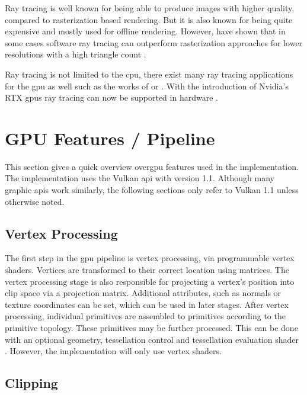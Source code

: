 Ray tracing is well known for being able to produce images with higher quality, compared to rasterization based rendering. But it is also known for being quite expensive and mostly used for offline rendering. However, \textcite{wald:2001:interactive} have shown that in some cases software ray tracing can  outperform rasterization approaches for lower resolutions with a high triangle count \cite{wald:2001:interactive}.

Ray tracing is not limited to the \gls{cpu}, there exist many ray tracing applications for the \gls{gpu} as well such as the works of \textcite{foley:2005:kd} or \textcite{parker:2010:optix}. With the introduction of Nvidia's RTX \glspl{gpu} ray tracing can now be supported in hardware \cite{raytracinggems}.


\section{GPU Features / Pipeline}

This section gives a quick overview over\gls{gpu} features used in the implementation. The implementation uses the Vulkan \gls{api} with version 1.1. Although many graphic \glspl{api} work similarly, the following sections only refer to Vulkan 1.1 unless otherwise noted.


\subsection{Vertex Processing}

The first step in the \gls{gpu} pipeline is vertex processing, via programmable vertex shaders. Vertices are transformed to their correct location using matrices. The vertex processing stage is also responsible for projecting a vertex's position into clip space via a projection matrix. Additional attributes, such as normals or texture coordinates can be set, which can be used in later stages. After vertex processing, individual primitives are assembled to primitives according to the primitive topology. These primitives may be further processed. This can be done with an optional geometry, tessellation control and tessellation evaluation shader \cite{akine:2018:realtime, khronos:vulkan:spec1.1}. However, the implementation will only use vertex shaders.


\subsection{Clipping}
\label{section:clipping}

